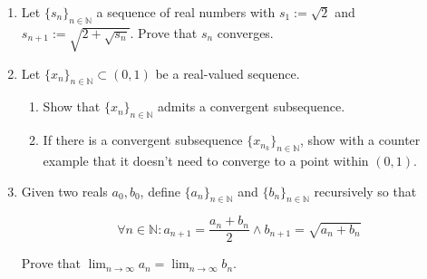 \documentclass{article}
\theoremstyle{definition}
\begin{document}
\begin{enumerate}
    \item Let $\{s_{n}\}_{n \in \mathbb{N}}$ a sequence of real numbers with $s_{1} := \sqrt{2}$ and $s_{n+1} := \sqrt{2 + \sqrt{s_{n}}}$. Prove that $s_{n}$ converges.

    \item
    Let $\{x_{n}\}_{n \in \mathbb{N}} \subset (0,1)$ be a real-valued sequence. 

    \begin{enumerate}
        \item Show that $\{x_{n}\}_{n \in \mathbb{N}}$ admits a convergent subsequence.

        
        
        \item If there is a convergent subsequence $\{x_{n_{k}}\}_{n \in \mathbb{N}}$, show with a counter example that it doesn't need to converge to a point within $(0,1)$.
    \end{enumerate}

    \item Given two reals $a_0, b_0$, define $\{a_{n}\}_{n \in \mathbb{N}}$ and $\{b_{n}\}_{n \in \mathbb{N}}$ recursively so that

    \[ \forall n \in \mathbb{N}: a_{n+1} = \frac{a_{n} + b_{n}}{2} \wedge b_{n+1} = \sqrt{a_{n} + b_{n}}\]

    Prove that $\lim_{n\to\infty} a_{n} = \lim_{n\to\infty} b_{n}$.
\end{enumerate}
\end{document}

